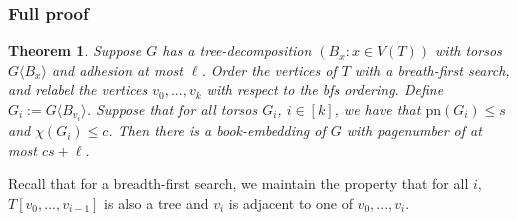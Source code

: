 \documentclass[]{report}
\newcommand{\pn}{\text{pn}}
\newtheorem{theorem}{Theorem}
\theoremstyle{definition}
\numberwithin{theorem}{section}
\numberwithin{equation}{section}
\begin{document}
\subsubsection{Full proof}
\begin{theorem}
	Suppose $G$ has a tree-decomposition $(B_x: x \in V(T))$ with torsos $G \langle B_x \rangle$ and adhesion at most $\ell$. Order the vertices of $T$ with a breath-first search, and relabel the vertices $v_0, ..., v_k$ with respect to the bfs ordering. Define $G_i := G \langle B_{v_i} \rangle $. Suppose that for all torsos $G_i$, $i \in [k]$, we have that $\pn(G_i) \leq s$ and $\chi(G_i) \leq c$. Then there is a book-embedding of $G$ with pagenumber of at most $cs + \ell$. 
\end{theorem}
Recall that for a breadth-first search, we maintain the property that for all $i$, $T[v_0, ..., v_{i - 1}]$ is also a tree and $v_i$ is adjacent to one of $v_0, ..., v_{i}$. 
\end{document}
